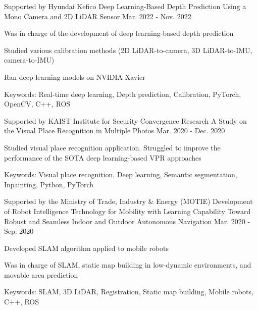 \begin{cventries}
  \cventry
    {Supported by Hyundai Kefico} %
    {Deep Learning-Based Depth Prediction Using a Mono Camera and 2D LiDAR Sensor} %
    {\urban} %
    {Mar. 2022 - Nov. 2022} %
    {
      \begin{cvitems} %
        \item Was in charge of the development of deep learning-based depth prediction
        \item Studied various calibration methods (2D LiDAR-to-camera, 3D LiDAR-to-IMU, camera-to-IMU)
        \item Ran deep learning models on NVIDIA Xavier
        \item Keywords: Real-time deep learning, Depth prediction, Calibration, PyTorch, OpenCV, C++, ROS
      \end{cvitems}
    }

  \cventry
    {Supported by KAIST Institute for Security Convergence Research} %
    {A Study on the Visual Place Recognition in Multiple Photos} %
    {\urban} %
    {Mar. 2020 - Dec. 2020} %
    {
      \begin{cvitems} %
        \item Studied visual place recognition application. Struggled to improve the performance of the SOTA deep learning-based VPR approaches
        \item Keywords: Visual place recognition, Deep learning, Semantic segmentation, Inpainting, Python, PyTorch
      \end{cvitems}
    }

  \cventry
    {Supported by the Ministry of Trade, Industry \& Energy (MOTIE)} %
    {Development of Robot Intelligence Technology for Mobility with Learning Capability Toward Robust and Seamless Indoor and Outdoor Autonomous Navigation} %
    {\urban} %
    {Mar. 2020 - Sep. 2020} %
    {
      \begin{cvitems} %
        \item Developed SLAM algorithm applied to mobile robots
        \item Was in charge of SLAM, static map building in low-dynamic environments, and movable area prediction
        \item Keywords: SLAM, 3D LiDAR, Registration, Static map building, Mobile robots, C++, ROS
      \end{cvitems}
    }


\end{cventries}

